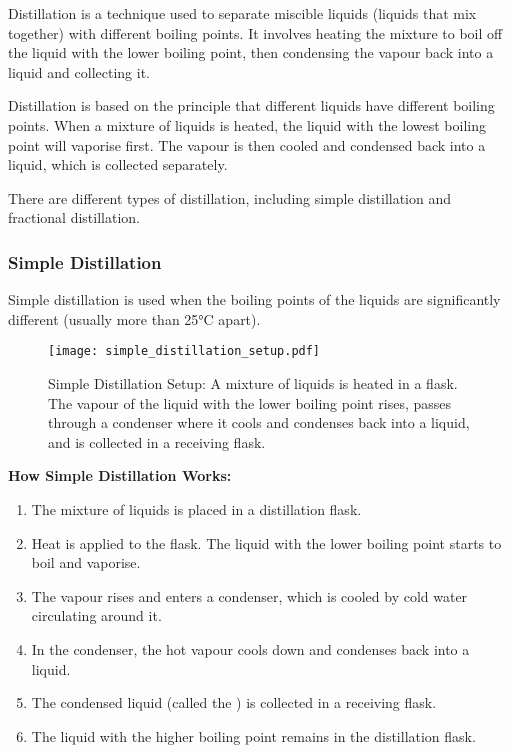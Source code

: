 \begin{keyconcept}{Distillation}
 is a technique used to separate miscible liquids (liquids that mix together) with different boiling points. It involves heating the mixture to boil off the liquid with the lower boiling point, then condensing the vapour back into a liquid and collecting it.
\end{keyconcept}

Distillation is based on the principle that different liquids have different boiling points. When a mixture of liquids is heated, the liquid with the lowest boiling point will vaporise first. The vapour is then cooled and condensed back into a liquid, which is collected separately.


There are different types of distillation, including simple distillation and fractional distillation.

\subsubsection{Simple Distillation}

Simple distillation is used when the boiling points of the liquids are significantly different (usually more than 25°C apart).

\begin{figure}
\centering
\texttt{[image: simple\_distillation\_setup.pdf]}
\caption{Simple Distillation Setup: A mixture of liquids is heated in a flask. The vapour of the liquid with the lower boiling point rises, passes through a condenser where it cools and condenses back into a liquid, and is collected in a receiving flask.}
\end{figure}

\textbf{How Simple Distillation Works:}
\begin{enumerate}
    \item The mixture of liquids is placed in a distillation flask.
    \item Heat is applied to the flask. The liquid with the lower boiling point starts to boil and vaporise.
    \item The vapour rises and enters a condenser, which is cooled by cold water circulating around it.
    \item In the condenser, the hot vapour cools down and condenses back into a liquid.
    \item The condensed liquid (called the ) is collected in a receiving flask.
    \item The liquid with the higher boiling point remains in the distillation flask.
\end{enumerate}

